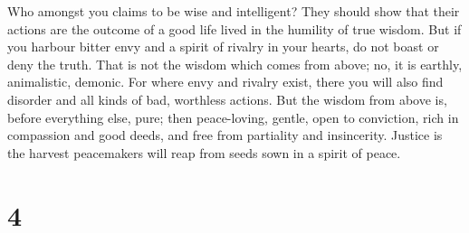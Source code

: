  Who amongst you claims to be wise and intelligent? They
should show that their actions are the outcome of a good life lived in
the humility of true wisdom.  But if you harbour bitter
envy and a spirit of rivalry in your hearts, do not boast or deny the
truth.  That is not the wisdom which comes from above; no,
it is earthly, animalistic, demonic.  For where envy and
rivalry exist, there you will also find disorder and all kinds of bad,
worthless actions.  But the wisdom from above is, before
everything else, pure; then peace-loving, gentle, open to conviction,
rich in compassion and good deeds, and free from partiality and
insincerity.  Justice is the harvest peacemakers will reap
from seeds sown in a spirit of peace.

\hypertarget{section-3}{%
\section{4}\label{section-3}}

